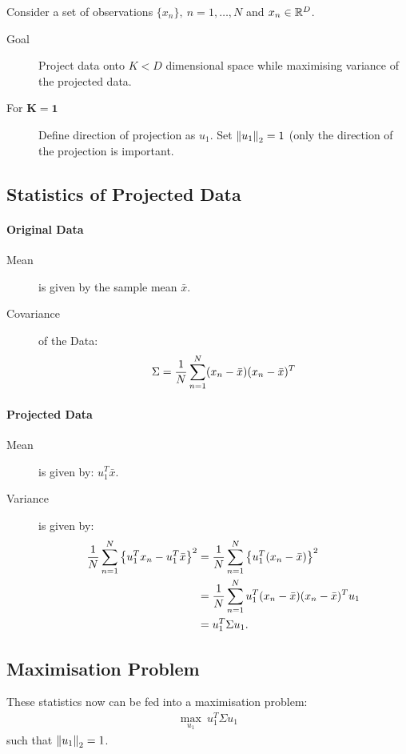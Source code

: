 Consider a set of observations $\{x_n\},\ n=1, \ldots, N$ and $x_n \in \mathbb{R}^D$.
\begin{description}
\item[Goal] Project data onto $K<D$ dimensional space while maximising variance of the projected data.
\item[For $\mathbf{K=1}$]  Define direction of projection as $u_1$. Set $\left\lVert u_1\right\rVert_2 =1$ (only the direction of the projection is important.
\end{description}
\subsection{Statistics of Projected Data}
\paragraph{Original Data}
\begin{description}
\item[Mean] is given by the sample mean $\bar x$.
\item[Covariance] of the Data:
\begin{align*}
    \Sigma   = {1\over N} \sum_{n=1}^N (x_n - \bar x)(x_n - \bar x)^T
\end{align*}
\end{description}
\paragraph{Projected Data}
\begin{description}
\item[Mean] is given by: $u_1^T\bar x$.
\item[Variance] is given by:
\begin{align*}
    {1\over N} \sum_{n=1}^N \left\{ u_1^T x_n-u_1^T \bar x\right\}^2 
        &= {1\over N} \sum_{n=1}^N \left\{u_1^T (x_n-\bar x)\right\}^2\\
        &= {1\over N} \sum_{n=1}^N u_1^T (x_n - \bar x)(x_n-\bar x)^T u_1\\
        &= u_1^T \Sigma u_1.
\end{align*}
\end{description}

\subsection{Maximisation Problem}
These statistics now can be fed into a maximisation problem:
\begin{align*}
    \max_{u_1}\ u_1^T \Sigma u_1
\end{align*}
such that $\left\lVert u_1\right\rVert_2 = 1$.

